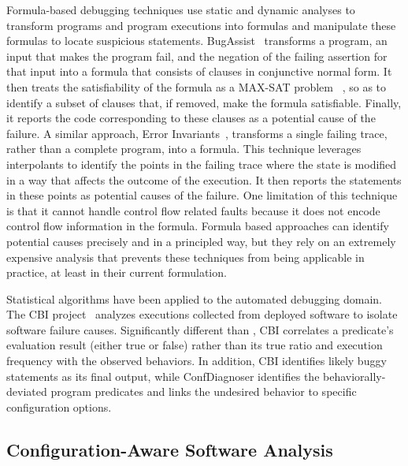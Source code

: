 

Formula-based debugging techniques use static and
dynamic analyses to transform programs and program executions
into formulas and manipulate these formulas to locate suspicious
statements. BugAssist~\cite{} transforms a program, an input that
makes the program fail, and the negation of the failing assertion
for that input into a formula that consists of clauses in
conjunctive normal form. It then treats the satisfiability of
the formula as a MAX-SAT problem ~\cite{},
so as to identify a subset of clauses
that, if removed, make the formula satisfiable. Finally, it reports
the code corresponding to these clauses as a potential cause of the
failure. A similar approach, Error Invariants~\cite{},
transforms a single failing trace, rather than a complete program,
into a formula. This technique leverages interpolants to identify
the points in the
failing trace where the state is modified in a way that affects the 
outcome of the execution. It then reports the statements in these
points as potential causes of the failure. One limitation of this
technique is that it cannot handle control flow related faults because it
does not encode control flow information in the formula.
 Formula based approaches can identify potential causes precisely
 and in a principled way, but they rely on an
extremely expensive analysis that prevents these techniques from
being applicable in practice, at least in their current formulation.



Statistical algorithms have been applied to the automated
debugging domain. 
The CBI project~\cite{} analyzes executions
collected from deployed software to isolate software failure
causes. Significantly different than \ourtool, CBI correlates
a predicate's evaluation result (either true or false) rather
than its true ratio and execution frequency with the observed
behaviors. In addition, CBI identifies likely buggy statements as
its final output, while ConfDiagnoser identifies the
behaviorally-deviated program predicates and links the undesired behavior
to specific configuration options. 


\subsection{Configuration-Aware Software Analysis}

